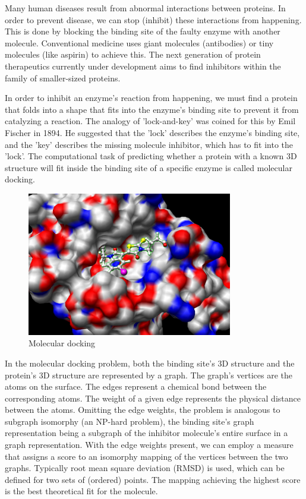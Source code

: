 Many human diseases result from abnormal interactions between proteins. In order to prevent disease, we can stop (inhibit) these interactions from happening. This is done by blocking the binding site of the faulty enzyme with another molecule. Conventional medicine uses giant molecules (antibodies) or tiny molecules (like aspirin) to achieve this. The next generation of protein therapeutics currently under development aims to find inhibitors within the family of smaller-sized proteins.
 \cite{ryan_proteinprotein_2005}

In order to inhibit an enzyme's reaction from happening, we must find a protein that folds into a shape that fits into the enzyme's binding site to prevent it from catalyzing a reaction. The analogy of 'lock-and-key' was coined for this by Emil Fischer in 1894. He suggested that the 'lock' describes the enzyme's binding site, and the 'key' describes the missing molecule inhibitor, which has to fit into the 'lock'. \cite{a_molecular_2018} \cite{walker_molecular_2008} The computational task of predicting whether a protein with a known 3D structure will fit inside the binding site of a specific enzyme is called molecular docking.

\begin{figure}[H]
    \centering
    \includegraphics[width=0.8\textwidth]{figures/bioinformatics/molecular_docking.jpg}
    \caption{Molecular docking\cite{chaos_chemical_2008}}
\end{figure}

In the molecular docking problem, both the binding site's 3D structure and the protein's 3D structure are represented by a graph. The graph's vertices are the atoms on the surface. The edges represent a chemical bond between the corresponding atoms. The weight of a given edge represents the physical distance between the atoms. Omitting the edge weights, the problem is analogous to subgraph isomorphy (an NP-hard problem), the binding site's graph representation being a subgraph of the inhibitor molecule's entire surface in a graph representation. With the edge weights present, we can employ a measure that assigns a score to an isomorphy mapping of the vertices between the two graphs. Typically root mean square deviation (RMSD) is used, which can be defined for two sets of (ordered) points. The mapping achieving the highest score is the best theoretical fit for the molecule.
 \cite{wang_protein_2021}

